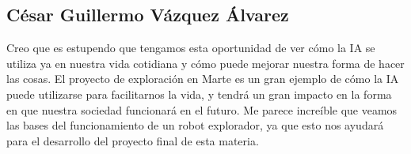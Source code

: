 \documentclass{article}
\begin{document}
        \subsection{César Guillermo Vázquez Álvarez}
            Creo que es estupendo que tengamos esta oportunidad de ver cómo la IA se utiliza ya en nuestra vida cotidiana y cómo puede mejorar nuestra forma de hacer las cosas. El proyecto de exploración en Marte es un gran ejemplo de cómo la IA puede utilizarse para facilitarnos la vida, y tendrá un gran impacto en la forma en que nuestra sociedad funcionará en el futuro. Me parece increíble que veamos las bases del funcionamiento de un robot explorador, ya que esto nos ayudará para el desarrollo del proyecto final de esta materia.

    \clearpage
    \nocite{*}
    \printbibliography
\end{document}
